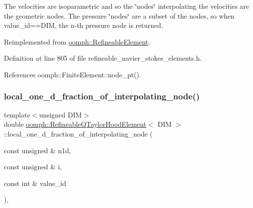 The velocities are isoparametric and so the \char`\"{}nodes\char`\"{} interpolating the velocities are the geometric nodes. The pressure \char`\"{}nodes\char`\"{} are a subset of the nodes, so when value\+\_\+id==D\+IM, the n-\/th pressure node is returned. 



Reimplemented from \hyperlink{classoomph_1_1RefineableElement_ab27986fc2f6033a4758662cde78a7b76}{oomph\+::\+Refineable\+Element}.



Definition at line 805 of file refineable\+\_\+navier\+\_\+stokes\+\_\+elements.\+h.



References oomph\+::\+Finite\+Element\+::node\+\_\+pt().

\mbox{\label{classoomph_1_1RefineableQTaylorHoodElement_a9983c7e51e0968b7627f5c25eb836f18}} 
\subsubsection{\texorpdfstring{local\+\_\+one\+\_\+d\+\_\+fraction\+\_\+of\+\_\+interpolating\+\_\+node()}{local\_one\_d\_fraction\_of\_interpolating\_node()}}
{\footnotesize\ttfamily template$<$unsigned D\+IM$>$ \\
double \hyperlink{classoomph_1_1RefineableQTaylorHoodElement}{oomph\+::\+Refineable\+Q\+Taylor\+Hood\+Element}$<$ D\+IM $>$\+::local\+\_\+one\+\_\+d\+\_\+fraction\+\_\+of\+\_\+interpolating\+\_\+node (\begin{DoxyParamCaption}\item[{const unsigned \&}]{n1d,  }\item[{const unsigned \&}]{i,  }\item[{const int \&}]{value\+\_\+id }\end{DoxyParamCaption})\hspace{0.3cm}{\ttfamily [inline]}, {\ttfamily [virtual]}}



